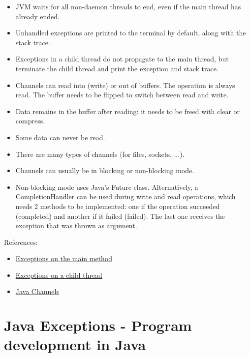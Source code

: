 \documentclass[a4paper,11pt]{article}
\theoremstyle{plain}
\theoremstyle{nonumberplain}
\begin{document}
\begin{itemize}
  \item JVM waits for all non-daemon threads to end, even if the main thread has already ended.
  \item Unhandled exceptions are printed to the terminal by default, along with the stack trace.
  \item Exceptions in a child thread do not propagate to the main thread, but terminate the child thread and print the exception and stack trace.
  \item Channels can read into (write) or out of buffers. The operation is always read. The buffer needs to be flipped to switch between read and write.
  \item Data remains in the buffer after reading: it needs to be freed with clear or compress.
  \item Some data can never be read.
  \item There are many types of channels (for files, sockets, ...).
  \item Channels can usually be in blocking or non-blocking mode.
  \item Non-blocking mode uses Java's Future class. Alternatively, a CompletionHandler can be used during write and read operations, which needs 2 methods to be implemented: one if the operation succeeded (completed) and another if it failed (failed). The last one receives the exception that was thrown as argument.
\end{itemize}

References:

\begin{itemize}
  \item \href{https://marcelkliemannel.com/articles/2021/what-happens-if-the-main-method-throws-an-exception/}{Exceptions on the main method}
  \item \href{https://medium.com/@balajiselvam245/handling-uncaught-exceptions-in-java-fc973b57d809}{Exceptions on a child thread}
  \item \href{https://jenkov.com/tutorials/java-nio/index.html}{Java Channels}
\end{itemize}

\section{Java Exceptions - Program development in Java}
\end{document}
